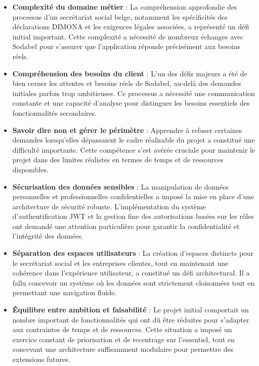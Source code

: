 \begin{itemize}[leftmargin=*,label=\textcolor{darkgray}{$\bullet$},itemsep=0.3em]
  \item \textbf{Complexité du domaine métier} : La compréhension approfondie des processus d'un secrétariat social belge, notamment les spécificités des déclarations DIMONA et les exigences légales associées, a représenté un défi initial important. Cette complexité a nécessité de nombreux échanges avec Sodabel pour s'assurer que l'application réponde précisément aux besoins réels.

  \item \textbf{Compréhension des besoins du client} : L'un des défis majeurs a été de bien cerner les attentes et besoins réels de Sodabel, au-delà des demandes initiales parfois trop ambitieuses. Ce processus a nécessité une communication constante et une capacité d'analyse pour distinguer les besoins essentiels des fonctionnalités secondaires.

  \item \textbf{Savoir dire non et gérer le périmètre} : Apprendre à refuser certaines demandes lorsqu'elles dépassaient le cadre réalisable du projet a constitué une difficulté importante. Cette compétence s'est avérée cruciale pour maintenir le projet dans des limites réalistes en termes de temps et de ressources disponibles.

  \item \textbf{Sécurisation des données sensibles} : La manipulation de données personnelles et professionnelles confidentielles a imposé la mise en place d'une architecture de sécurité robuste. L'implémentation du système d'authentification JWT et la gestion fine des autorisations basées sur les rôles ont demandé une attention particulière pour garantir la confidentialité et l'intégrité des données.

  \item \textbf{Séparation des espaces utilisateurs} : La création d'espaces distincts pour le secrétariat social et les entreprises clientes, tout en maintenant une cohérence dans l'expérience utilisateur, a constitué un défi architectural. Il a fallu concevoir un système où les données sont strictement cloisonnées tout en permettant une navigation fluide.

  \item \textbf{Équilibre entre ambition et faisabilité} : Le projet initial comportait un nombre important de fonctionnalités qui ont dû être réduites pour s'adapter aux contraintes de temps et de ressources. Cette situation a imposé un exercice constant de priorisation et de recentrage sur l'essentiel, tout en concevant une architecture suffisamment modulaire pour permettre des extensions futures.
\end{itemize}

